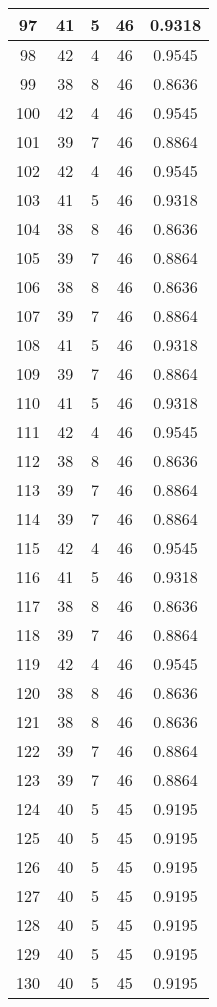 \documentclass[letterpaper, 12pt]{article}
\begin{document}
\begin{longtable}{|c|c|c|c|c|}
\hline
97 & 41 & 5 & 46 & 0.9318 \\
\hline
98 & 42 & 4 & 46 & 0.9545 \\
\hline
99 & 38 & 8 & 46 & 0.8636 \\
\hline
100 & 42 & 4 & 46 & 0.9545 \\
\hline
101 & 39 & 7 & 46 & 0.8864 \\
\hline
102 & 42 & 4 & 46 & 0.9545 \\
\hline
103 & 41 & 5 & 46 & 0.9318 \\
\hline
104 & 38 & 8 & 46 & 0.8636 \\
\hline
105 & 39 & 7 & 46 & 0.8864 \\
\hline
106 & 38 & 8 & 46 & 0.8636 \\
\hline
107 & 39 & 7 & 46 & 0.8864 \\
\hline
108 & 41 & 5 & 46 & 0.9318 \\
\hline
109 & 39 & 7 & 46 & 0.8864 \\
\hline
110 & 41 & 5 & 46 & 0.9318 \\
\hline
111 & 42 & 4 & 46 & 0.9545 \\
\hline
112 & 38 & 8 & 46 & 0.8636 \\
\hline
113 & 39 & 7 & 46 & 0.8864 \\
\hline
114 & 39 & 7 & 46 & 0.8864 \\
\hline
115 & 42 & 4 & 46 & 0.9545 \\
\hline
116 & 41 & 5 & 46 & 0.9318 \\
\hline
117 & 38 & 8 & 46 & 0.8636 \\
\hline
118 & 39 & 7 & 46 & 0.8864 \\
\hline
119 & 42 & 4 & 46 & 0.9545 \\
\hline
120 & 38 & 8 & 46 & 0.8636 \\
\hline
121 & 38 & 8 & 46 & 0.8636 \\
\hline
122 & 39 & 7 & 46 & 0.8864 \\
\hline
123 & 39 & 7 & 46 & 0.8864 \\
\hline
124 & 40 & 5 & 45 & 0.9195 \\
\hline
125 & 40 & 5 & 45 & 0.9195 \\
\hline
126 & 40 & 5 & 45 & 0.9195 \\
\hline
127 & 40 & 5 & 45 & 0.9195 \\
\hline
128 & 40 & 5 & 45 & 0.9195 \\
\hline
129 & 40 & 5 & 45 & 0.9195 \\
\hline
130 & 40 & 5 & 45 & 0.9195 \\

\end{longtable}
\end{document}
